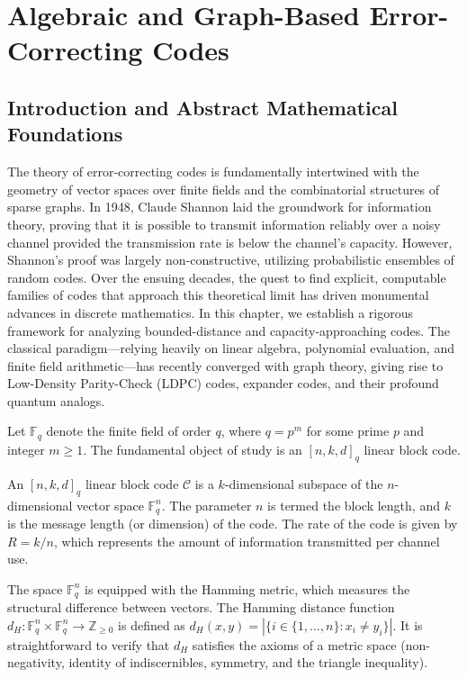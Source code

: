 \chapter{Algebraic and Graph-Based Error-Correcting Codes}
\label{ch:error_correcting_codes}

\section{Introduction and Abstract Mathematical Foundations}

The theory of error-correcting codes is fundamentally intertwined with the geometry of vector spaces over finite fields and the combinatorial structures of sparse graphs. In 1948, Claude Shannon laid the groundwork for information theory, proving that it is possible to transmit information reliably over a noisy channel provided the transmission rate is below the channel's capacity. However, Shannon's proof was largely non-constructive, utilizing probabilistic ensembles of random codes. Over the ensuing decades, the quest to find explicit, computable families of codes that approach this theoretical limit has driven monumental advances in discrete mathematics. In this chapter, we establish a rigorous framework for analyzing bounded-distance and capacity-approaching codes. The classical paradigm---relying heavily on linear algebra, polynomial evaluation, and finite field arithmetic---has recently converged with graph theory, giving rise to Low-Density Parity-Check (LDPC) codes, expander codes, and their profound quantum analogs.

Let $\mathbb{F}_q$ denote the finite field of order $q$, where $q = p^m$ for some prime $p$ and integer $m \ge 1$. The fundamental object of study is an $[n, k, d]_q$ linear block code.

\begin{definition}
An $[n, k, d]_q$ linear block code $\mathcal{C}$ is a $k$-dimensional subspace of the $n$-dimensional vector space $\mathbb{F}_q^n$. The parameter $n$ is termed the block length, and $k$ is the message length (or dimension) of the code. The rate of the code is given by $R = k/n$, which represents the amount of information transmitted per channel use.
\end{definition}

The space $\mathbb{F}_q^n$ is equipped with the Hamming metric, which measures the structural difference between vectors. The Hamming distance function $d_H : \mathbb{F}_q^n \times \mathbb{F}_q^n \to \mathbb{Z}_{\ge 0}$ is defined as $d_H(x, y) = |\{i \in \{1, \dots, n\} : x_i \neq y_i \}|$. It is straightforward to verify that $d_H$ satisfies the axioms of a metric space (non-negativity, identity of indiscernibles, symmetry, and the triangle inequality).

